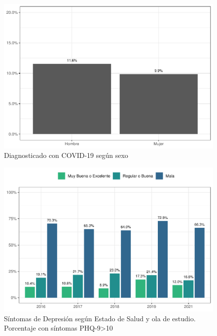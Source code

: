 \documentclass[
  12pt,
  openany]{book}
\begin{document}
\begin{figure}

{\centering \includegraphics{reporte-elsoc_files/figure-latex/covid-sexo-1} 

}

\caption{Diagnosticado con COVID-19 según sexo}\label{fig:covid-sexo}
\end{figure}

\begin{figure}

{\centering \includegraphics{reporte-elsoc_files/figure-latex/depre-s03-1} 

}

\caption{Síntomas de Depresión según Estado de Salud y ola de estudio. Porcentaje con síntomas PHQ-9>10}\label{fig:depre-s03}
\end{figure}
\end{document}
